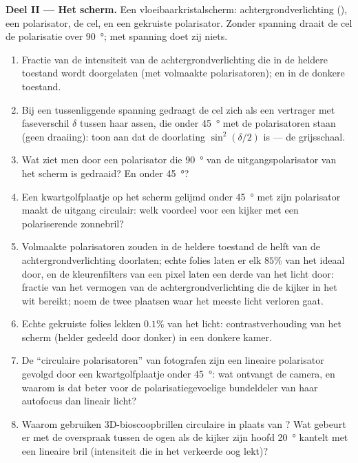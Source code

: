 \begin{problem}
\medskip
\noindent\textbf{Deel II --- Het scherm.}
Een vloeibaarkristalscherm: achtergrondverlichting (), een
polarisator, de cel, en een gekruiste polarisator. Zonder spanning draait de
cel de polarisatie over \qty{90}{\degree}; met spanning doet zij niets.
\begin{enumerate}[resume]
  \item Fractie van de intensiteit van de achtergrondverlichting die in de
        heldere toestand wordt doorgelaten (met volmaakte polarisatoren); en
        in de donkere toestand.
  \item Bij een tussenliggende spanning gedraagt de cel zich als een
        vertrager met faseverschil $\delta$ tussen haar assen, die onder
        \qty{45}{\degree} met de polarisatoren staan (geen draaiing): toon
        aan dat de doorlating $\sin^2(\delta/2)$ is --- de grijsschaal.
  \item Wat ziet men door een polarisator die \qty{90}{\degree} van de
        uitgangspolarisator van het scherm is gedraaid? En onder
        \qty{45}{\degree}?
  \item Een kwartgolfplaatje op het scherm gelijmd onder \qty{45}{\degree}
        met zijn polarisator maakt de uitgang circulair: welk voordeel voor
        een kijker met een polariserende zonnebril?
  \item Volmaakte polarisatoren zouden in de heldere toestand de helft van
        de achtergrondverlichting doorlaten; echte folies laten er elk
        $85\%$ van het ideaal door, en de kleurenfilters van een pixel laten
        een derde van het licht door: fractie van het vermogen van de
        achtergrondverlichting die de kijker in het wit bereikt; noem de
        twee plaatsen waar het meeste licht verloren gaat.
  \item Echte gekruiste folies lekken $0.1\%$ van het licht:
        contrastverhouding van het scherm (helder gedeeld door donker) in
        een donkere kamer.
  \item De ``circulaire polarisatoren'' van fotografen zijn een lineaire
        polarisator gevolgd door een kwartgolfplaatje onder
        \qty{45}{\degree}: wat ontvangt de camera, en waarom is dat beter
        voor de polarisatiegevoelige bundeldeler van haar autofocus dan
        lineair licht?
  \item Waarom gebruiken 3D-bioscoopbrillen circulaire in plaats van
        ? Wat gebeurt er met de overspraak tussen de
        ogen als de kijker zijn hoofd \qty{20}{\degree} kantelt met een
        lineaire bril (intensiteit die in het verkeerde oog lekt)?
\end{enumerate}


\end{problem}
